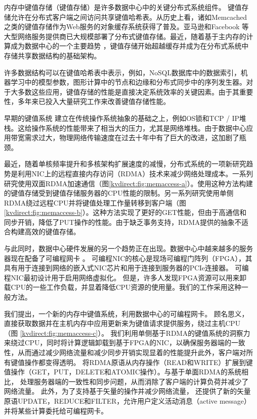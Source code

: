 内存中键值存储（键值存储）是许多数据中心中的关键分布式系统组件。 键值存储允许在分布式客户端之间访问共享键值哈希表。从历史上看，诸如Memcached \cite {fitzpatrick2004distributed}之类的键值存储作为Web服务的对象缓存系统获得了普及。亚马逊\cite {decandia2007dynamo}和Facebook \cite {atikoglu2012workload,nishtala2013scaling}等大型网络服务提供商已大规模部署了分布式键值存储。最近，随着基于主内存的计算成为数据中心的一个主要趋势 \cite{ousterhout2010case,dragojevic2014farm}，键值存储开始超越缓存并成为在分布式系统中存储共享数据结构的基础架构。

许多数据结构可以在键值哈希表中表示，例如，NoSQL数据库中的数据索引\cite {chang2008bigtable}，机器学习中的模型参数\cite {li2014scaling}，图形计算中的节点和边缘\cite {shao2013trinity,xiao17tux2}和分布式同步中的序列发生器\cite {kalia2016design}。对于大多数这些应用，键值存储的性能是直接决定系统效率的关键因素。由于其重要性，多年来已投入大量研究工作来改善键值存储性能。

早期的键值系统\cite {decandia2007dynamo,fitzpatrick2004distributed,nishtala2013scaling} 建立在传统操作系统抽象的基础之上，例如OS锁和TCP / IP堆栈。这给操作系统的性能带来了相当大的压力，尤其是网络堆栈。由于数据中心应用带宽需求过大，物理网络传输速度在过去十年中有了巨大的改进，这加剧了瓶颈。

最近，随着单核频率提升和多核架构扩展速度的减慢，分布式系统的一项新研究趋势是利用NIC上的远程直接内存访问（RDMA）技术来减少网络处理成本。一系列研究\cite {kalia2014using,kalia2016design}使用双面RDMA加速通信（图\ref {kvdirect:fig:memaccess-a}）。使用这种方法构建的键值存储受到键值存储服务器的CPU性能的限制。另一系列研究使用单侧RDMA绕过远程CPU并将键值处理工作量转移到客户端\cite {dragojevic2014farm,mitchell2013using}（图\ref {kvdirect:fig:memaccess-b}）。这种方法实现了更好的GET性能，但由于高通信和同步开销，降低了PUT操作的性能。由于缺乏事务支持，RDMA提供的抽象不适合构建高效的键值存储。

与此同时，数据中心硬件发展的另一个趋势正在出现。数据中心中越来越多的服务器现在配备了可编程网卡 \cite{caulfield2016cloud,greenberg2015sdn,putnam2014reconfigurable}。
可编程NIC的核心是现场可编程门阵列（FPGA），其具有用于连接到网络的嵌入式NIC芯片和用于连接到服务器的PCIe连接器。
可编程NIC最初设计用于启用网络虚拟化\cite {vfp,li2016clicknp}。
但是，许多人发现FPGA资源可以用来卸载CPU的一些工作负载，并显着降低CPU资源的使用量\cite {ouyang14hotchips,MaZC17fpga,huang16socc,cong16dac}。我们的工作采用这种一般方法。

我们提出\oursys{}，一个新的内存中键值系统，利用数据中心的可编程网卡。
顾名思义，\oursys{} 直接获取数据并在主机内存中应用更新来为键值请求提供服务，绕过主机CPU（图 \ref {kvdirect:fig:memaccess-c}）。
我们利用单侧基于RDMA的键值系统的洞察力来绕过CPU，同时将计算逻辑卸载到基于FPGA的NIC，以确保服务器端的一致性，从而通过减少网络流量和减少同步开销实现显着的性能提升此外，客户端对所有键值操作都变得透明。
\oursys{} 将RDMA原语从内存操作（READ和WRITE）扩展到键值操作（GET，PUT，DELETE和ATOMIC操作）。与基于单面RDMA的系统相比，\oursys{} 处理服务器端的一致性和同步问题，从而消除了客户端的计算负荷并减少了网络流量。
此外，为了支持基于矢量的操作并减少网络流量，\oursys{} 还提供了新的矢量原语UPDATE，REDUCE和FILTER，允许用户定义活动消息（active message）\cite {eicken1992active}并将某些计算委托给可编程网卡。

